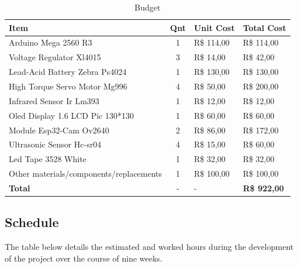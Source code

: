 \documentclass[a4paper,11pt]{article}
\begin{document}
\begin{table}[H]
  \small
  \caption{\small{Budget}}
  \begin{center}
    \begin{tabular}{|l|c|l|l|}
      \hline
      \textbf{Item}                           & \textbf{Qnt} & \textbf{Unit Cost} & \textbf{Total Cost} \\ \hline
      Arduino Mega 2560 R3                    & 1            & R\$ 114,00         & R\$ 114,00          \\ \hline
      Voltage Regulator Xl4015                & 3            & R\$ 14,00          & R\$ 42,00           \\ \hline
      Lead-Acid Battery Zebra Ps4024          & 1            & R\$ 130,00         & R\$ 130,00          \\ \hline
      High Torque Servo Motor Mg996           & 4            & R\$ 50,00          & R\$ 200,00          \\ \hline
      Infrared Sensor Ir Lm393                & 1            & R\$ 12,00          & R\$ 12,00           \\ \hline
      Oled Display 1.6 LCD Pic 130*130        & 1            & R\$ 60,00          & R\$ 60,00           \\ \hline
      Module Esp32-Cam Ov2640                 & 2            & R\$ 86,00          & R\$ 172,00          \\ \hline
      Ultrasonic Sensor Hc-sr04               & 4            & R\$ 15,00          & R\$ 60,00           \\ \hline
      Led Tape 3528 White                     & 1            & R\$ 32,00          & R\$ 32,00           \\ \hline
      Other materials/components/replacements & 1            & R\$ 100,00         & R\$ 100,00          \\ \hline
      \textbf{Total}                          & -            & -                  & \textbf{R\$ 922,00} \\ \hline
    \end{tabular}
  \end{center}
  \label{tab:budget}
\end{table}

\subsection{Schedule}
The table below details the estimated and worked hours during the development of the project over the course of nine weeks.
\end{document}
